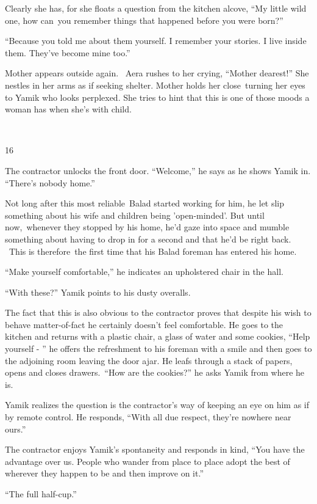 \documentclass[twoside,11pt]{book}
\begin{document}
Clearly she has, for she floats a question from the kitchen alcove, ``My little wild one, how can~you
remember things that happened before you were born?'' 

``Because you told me about them yourself. I remember your stories. I live inside them. They've become mine
too.''

Mother appears outside again. ~Aera rushes to her crying, ``Mother dearest!'' She nestles in
her arms as if seeking shelter. Mother holds her close~turning her eyes to Yamik who looks perplexed. She tries to hint
that this is one of those moods a woman has when she's with child. 

~

16 

The contractor unlocks the front door. ``Welcome,'' he says as he shows Yamik in.
``There's nobody home.'' 

Not long after this most reliable\ Balad started working for him, he let slip something about his wife and children
being {}'open-minded{}'. But until now,~whenever they stopped by his home, he'd gaze into space and mumble something
about having to drop in for a second and that he'd be right back. ~This is therefore~the first time that his Balad
foreman has entered his home.

``Make yourself comfortable,'' he indicates an upholstered chair in the hall.~ 

``With these?'' Yamik points to his dusty overalls. 

The fact that this is also obvious to the contractor proves that despite his wish to behave matter-of-fact he certainly
doesn't feel comfortable. He goes to the kitchen and returns with a plastic chair, a glass of water and some cookies,
``Help yourself - '' he offers the refreshment to his foreman with a smile and then goes to
the adjoining room leaving the door ajar. He leafs through a stack of papers, opens and closes
drawers.\ ``How are the cookies?'' he asks Yamik from where he is. 

Yamik realizes the question is the contractor's way of keeping an eye on him as if by remote control. He responds,
``With all due respect, they're nowhere near ours.'' 

The contractor enjoys Yamik's spontaneity and responds in kind, ``You have the advantage over us. People
who wander from place to place adopt the best of wherever they happen to be and then improve on it.'' 

``The full half-cup.''
\end{document}
